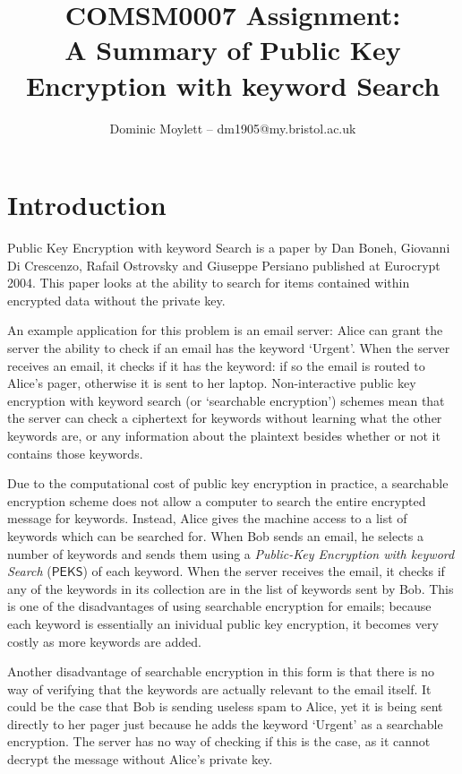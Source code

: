 \documentclass[a4paper,11pt]{article}
\title{COMSM0007 Assignment:\\A Summary of Public Key Encryption with keyword Search}
\author{Dominic Moylett -- dm1905@my.bristol.ac.uk}
\begin{document}
    \maketitle

    \section{Introduction}

    Public Key Encryption with keyword Search \cite{cryptoeprint:2003:195} is a paper by Dan Boneh, Giovanni Di Crescenzo, Rafail Ostrovsky and Giuseppe Persiano published at Eurocrypt 2004. This paper looks at the ability to search for items contained within encrypted data without the private key.

    An example application for this problem is an email server: Alice can grant the server the ability to check if an email has the keyword `Urgent'. When the server receives an email, it checks if it has the keyword: if so the email is routed to Alice's pager, otherwise it is sent to her laptop. Non-interactive public key encryption with keyword search (or `searchable encryption') schemes mean that the server can check a ciphertext for keywords without learning what the other keywords are, or any information about the plaintext besides whether or not it contains those keywords.

    Due to the computational cost of public key encryption in practice, a searchable encryption scheme does not allow a computer to search the entire encrypted message for keywords. Instead, Alice gives the machine access to a list of keywords which can be searched for. When Bob sends an email, he selects a number of keywords and sends them using a \textit{Public-Key Encryption with keyword Search} ($\mathsf{PEKS}$) of each keyword. When the server receives the email, it checks if any of the keywords in its collection are in the list of keywords sent by Bob. This is one of the disadvantages of using searchable encryption for emails; because each keyword is essentially an inividual public key encryption, it becomes very costly as more keywords are added.

    Another disadvantage of searchable encryption in this form is that there is no way of verifying that the keywords are actually relevant to the email itself. It could be the case that Bob is sending useless spam to Alice, yet it is being sent directly to her pager just because he adds the keyword `Urgent' as a searchable encryption. The server has no way of checking if this is the case, as it cannot decrypt the message without Alice's private key.
\end{document}
